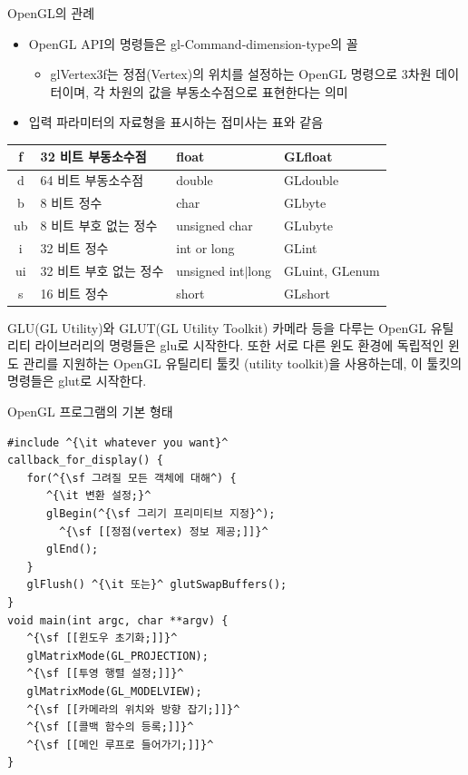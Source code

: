 \documentclass{beamer}
\begin{document}
\begin{frame}{OpenGL의 관례}

{\small 
\begin{itemize}
\item OpenGL API의 명령들은 gl-Command-dimension-type의 꼴
	\begin{itemize}
	\item glVertex3f는 정점(Vertex)의 위치를 설정하는 OpenGL 명령으로 3차원 데이터이며, 각 차원의 값을 부동소수점으로 표현한다는 의미
	\end{itemize}
\item 입력 파라미터의 자료형을 표시하는 접미사는 표와 같음
\end{itemize}

\begin{table}
\begin{tabular}{|c|l|l|l|} \hline
f & 32 비트 부동소수점 & float & GLfloat \\ \hline
d & 64 비트 부동소수점 & double & GLdouble \\ \hline
b & 8 비트 정수 & char & GLbyte \\ \hline
ub & 8 비트 부호 없는 정수 & unsigned char & GLubyte \\ \hline
i & 32 비트 정수 & int or long & GLint \\ \hline
ui & 32 비트 부호 없는 정수  & unsigned int$|$long & GLuint, GLenum \\ \hline
s & 16 비트 정수 & short & GLshort \\ \hline
\end{tabular}
\end{table}
}
\begin{block}{GLU(GL Utility)와 GLUT(GL Utility Toolkit)}
{\small 카메라 등을 다루는 OpenGL 유틸리티 라이브러리의 명령들은 glu로 시작한다. 또한 서로 다른 윈도 환경에 독립적인 윈도 관리를 지원하는 OpenGL 유틸리티 툴킷 (utility toolkit)을 사용하는데, 이 툴킷의 명령들은 glut로 시작한다.}
\end{block}

\end{frame}


\begin{frame}[fragile]{OpenGL 프로그램의 기본 형태}
\lstset{language=C++,escapechar=^} 
\begin{lstlisting}
#include ^{\it whatever you want}^
callback_for_display() {
   for(^{\sf 그려질 모든 객체에 대해^) {
      ^{\it 변환 설정;}^
      glBegin(^{\sf 그리기 프리미티브 지정}^);
      	^{\sf [[정점(vertex) 정보 제공;]]}^
      glEnd(); 
   }
   glFlush() ^{\it 또는}^ glutSwapBuffers();
}
void main(int argc, char **argv) {
   ^{\sf [[윈도우 초기화;]]}^
   glMatrixMode(GL_PROJECTION); 
   ^{\sf [[투영 행렬 설정;]]}^
   glMatrixMode(GL_MODELVIEW); 
   ^{\sf [[카메라의 위치와 방향 잡기;]]}^
   ^{\sf [[콜백 함수의 등록;]]}^
   ^{\sf [[메인 루프로 들어가기;]]}^
}
\end{lstlisting}
\end{frame}
\end{document}
